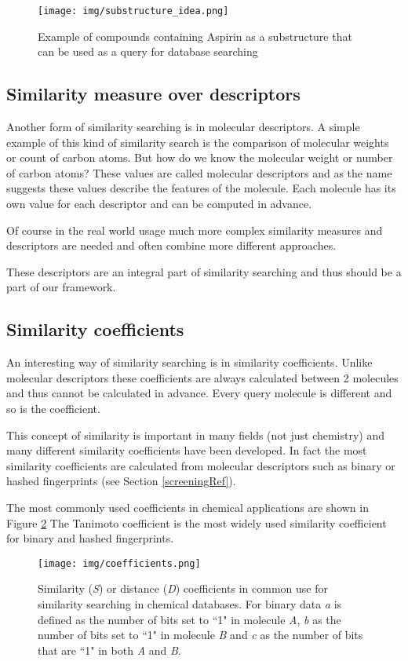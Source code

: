 \documentclass[thesis=M,english]{FITthesis}[2012/10/20]
\begin{document}
\begin{figure}
  \centering
  \texttt{[image: img/substructure\_idea.png]}
  \caption{Example of compounds containing Aspirin as a substructure that
can be used as a query for database searching}
  \label{fig:substructure_idea}
\end{figure}


\subsection{Similarity measure over descriptors}
Another form of similarity searching is in molecular descriptors. A simple example of this kind of similarity search is the comparison of molecular weights or count of carbon atoms. But how do we know the molecular weight or number of carbon atoms? These values are called molecular descriptors and as the name suggests these values describe the features of the molecule. Each molecule has its own value for each descriptor and can be computed in advance.

Of course in the real world usage much more complex similarity measures and descriptors are needed and often combine more different approaches.

These descriptors are an integral part of similarity searching and thus should be a part of our framework.


\subsection{Similarity coefficients}
An interesting way of similarity searching is in similarity coefficients. Unlike molecular descriptors these coefficients are always calculated between 2 molecules and thus cannot be calculated in advance. Every query molecule is different and so is the coefficient.

This concept of similarity is important in many fields (not just chemistry) and many different similarity coefficients have been developed. In fact the most similarity coefficients are calculated from molecular descriptors such as binary or hashed fingerprints (see Section \ref{screeningRef}).

The most commonly used coefficients in chemical applications are shown in Figure \ref{fig:coefficients} The Tanimoto coefficient is the most widely used similarity coefficient for binary and hashed fingerprints.\cite{intro}


\begin{figure}
  \centering
  \texttt{[image: img/coefficients.png]}
  \caption{Similarity (\textit{S}) or distance (\textit{D}) coefficients in common use for similarity searching in
chemical databases. For binary data \textit{a} is defined as the number of bits set to ``1" in molecule \textit{A},
\textit{b} as the number of bits set to ``1"  in molecule \textit{B} and \textit{c} as the number of bits that are ``1" in both
\textit{A} and \textit{B}.}
  \label{fig:coefficients}
\end{figure}
\end{document}
